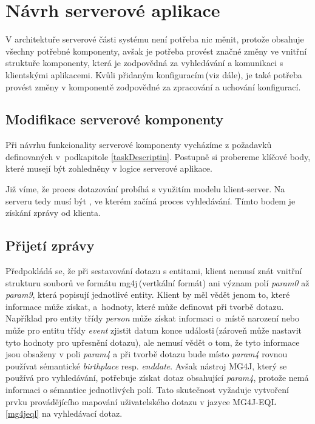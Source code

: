 \section{Návrh serverové aplikace}
\label{ServerAppProposal}
V architektuře serverové části systému není potřeba nic měnit, protože obsahuje všechny potřebné komponenty, avšak je potřeba provést značné změny ve vnitřní struktuře komponenty, která je zodpovědná za vyhledávání a komunikaci s klientskými aplikacemi. Kvůli přidaným konfiguracím\,(viz dále), je také potřeba provést změny v komponentě zodpovědné za zpracování a uchování konfigurací.

\subsection{Modifikace serverové komponenty}
Při návrhu funkcionality serverové komponenty vycházíme z požadavků definovaných v~podkapitole \ref{taskDescriptin}. Postupně si probereme klíčové body, které musejí být zohledněny v logice serverové aplikace. 

Již víme, že proces dotazování probíhá s využitím modelu klient-server. Na serveru tedy musí být , ve kterém začíná proces vyhledávání. Tímto bodem je získání zprávy od klienta.


\subsection*{Přijetí zprávy}
Předpokládá se, že při sestavování dotazu s entitami, klient nemusí znát vnitřní strukturu  souborů ve formátu mg4j\,(vertkální formát) ani význam polí \emph{param0} až \emph{param9}, která popisují jednotlivé entity. Klient by měl vědět jenom to, které informace může získat, a~hodnoty, které může definovat při tvorbě dotazu. Například pro entity třídy \emph{person} může získat informaci o~místě narození  nebo může pro entitu třídy \emph{event} zjistit datum konce události\,(zároveň může nastavit tyto hodnoty pro upřesnění dotazu), ale nemusí vědět o tom, že tyto informace jsou obsaženy v poli \emph{param4} a při tvorbě dotazu bude místo \emph{param4} rovnou používat sémantické \emph{birthplace} resp. \emph{enddate}. Avšak nástroj MG4J, který se používá pro vyhledávání, potřebuje získat dotaz obsahující \emph{param4}, protože nemá informaci o sémantice jednotlivých polí. Tato skutečnost vyžaduje vytvoření prvku provádějícího mapování uživatelského dotazu v jazyce MG4J-EQL \ref{mg4jeql} na vyhledávací dotaz.


